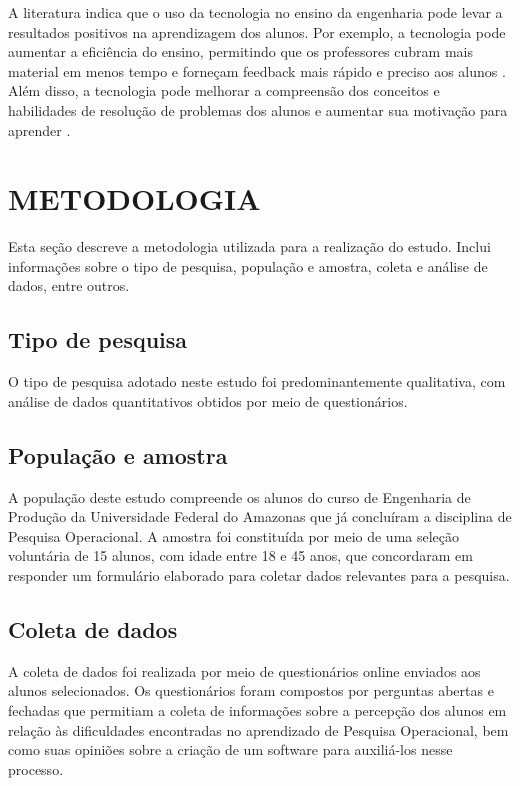 \documentclass{article}
\begin{document}
A literatura indica que o uso da tecnologia no ensino da engenharia pode levar a resultados positivos na aprendizagem dos alunos. Por exemplo, a tecnologia pode aumentar a eficiência do ensino, permitindo que os professores cubram mais material em menos tempo e forneçam feedback mais rápido e preciso aos alunos \cite{kay2009}. Além disso, a tecnologia pode melhorar a compreensão dos conceitos e habilidades de resolução de problemas dos alunos e aumentar sua motivação para aprender \cite{madathil2015}.

\section{METODOLOGIA}

Esta seção descreve a metodologia utilizada para a realização do estudo. Inclui informações sobre o tipo de pesquisa, população e amostra, coleta e análise de dados, entre outros.

\subsection{Tipo de pesquisa}

O tipo de pesquisa adotado neste estudo foi predominantemente qualitativa, com análise de dados quantitativos obtidos por meio de questionários.

\subsection{População e amostra}

A população deste estudo compreende os alunos do curso de Engenharia de Produção da Universidade Federal do Amazonas que já concluíram a disciplina de Pesquisa Operacional. A amostra foi constituída por meio de uma seleção voluntária de 15 alunos, com idade entre 18 e 45 anos, que concordaram em responder um formulário elaborado para coletar dados relevantes para a pesquisa.

\subsection{Coleta de dados}

A coleta de dados foi realizada por meio de questionários online enviados aos alunos selecionados. Os questionários foram compostos por perguntas abertas e fechadas que permitiam a coleta de informações sobre a percepção dos alunos em relação às dificuldades encontradas no aprendizado de Pesquisa Operacional, bem como suas opiniões sobre a criação de um software para auxiliá-los nesse processo.
\end{document}
